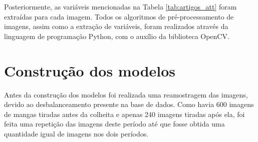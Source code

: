 \begin{figure}[!htb]
\end{figure}

Posteriormente, as variáveis mencionadas na Tabela \ref{tab:artigos_att} foram extraídas para cada imagem. Todos os algoritmos de pré-processamento de imagens, assim como a extração de variáveis, foram realizados através da linguagem de programação Python, com o auxílio da biblioteca OpenCV.

\section{Construção dos modelos}

Antes da construção dos modelos foi realizada uma reamostragem das imagens, devido ao desbalanceamento presente na base de dados. Como havia 600 imagens de mangas tiradas antes da colheita e apenas 240 imagens tiradas após ela, foi feita uma repetição das imagens deste período até que fosse obtida uma quantidade igual de imagens nos dois períodos.

